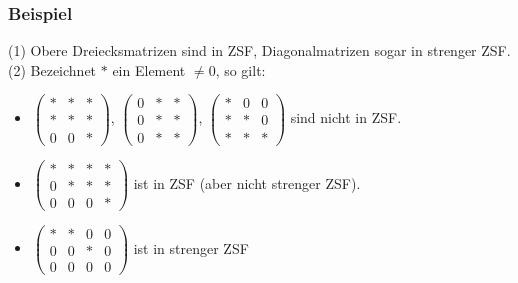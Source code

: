 \subsubsection{Beispiel}
(1) Obere Dreiecksmatrizen sind in ZSF, Diagonalmatrizen sogar in strenger ZSF.\\
(2) Bezeichnet $*$ ein Element $\not= 0$, so gilt:
\begin{itemize}
\item $\left(\begin{array}{ccc}* & * & *\\ * & * & *\\ 0 & 0 & *\end{array}\right)$,
$\left(\begin{array}{ccc}0 & * & *\\ 0 & * & *\\ 0 & * & *\end{array}\right)$,
$\left(\begin{array}{ccc}* & 0 & 0\\ * & * & 0\\ * & * & *\end{array}\right)$
sind nicht in ZSF.
\item $\left(\begin{array}{cccc}* & * & * & *\\ 0 & * & * & *\\ 0 & 0 & 0 & *\end{array}\right)$ ist in ZSF (aber nicht strenger ZSF).
\item $\left(\begin{array}{cccc}* & * & 0 & 0\\ 0 & 0 & * & 0\\ 0 & 0 & 0 & 0\end{array}\right)$ ist in strenger ZSF
\end{itemize}
